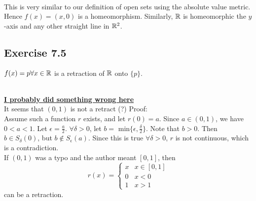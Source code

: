 \begin{solution}
 \\This is very similar to our definition of open sets using the absolute value metric. Hence $f(x) = (x,0)$ is a homeomorphism. Similarly, $\mathbb{R}$ is homeomorphic the $y$-axis and any other straight line in $\mathbb{R}^2$.
\end{solution}

\subsection{Exercise 7.5}


\begin{solution}
 $f(x) = p \forall x \in \mathbb{R}$ is a retraction of $\mathbb{R}$ onto $\{p\}$.
\end{solution}


\begin{solution}
 \\\underline{\textbf{I probably did something wrong here}} \\
 It seems that $(0,1)$ is not a retract (?) Proof: \\
 Assume such a function $r$ exists, and let $r(0) = a$. Since $a \in (0,1)$, we have $0 < a < 1$. Let $\epsilon = \frac{a}{2}$. $\forall \delta > 0$, let $b =$ min$\{\epsilon, \frac{\delta}{2}\}$. Note that $b > 0$. Then $b \in S_\delta(0)$, but $b \notin S_\epsilon(a)$. Since this is true $\forall \delta > 0$, $r$ is not continuous, which is a contradiction. \\
 If $(0,1)$ was a typo and the author meant $[0,1]$, then $$r(x) = \begin{cases} x & x \in [0,1] \\ 0 & x<0 \\ 1 & x > 1 \end{cases}$$ can be a retraction.
\end{solution}


